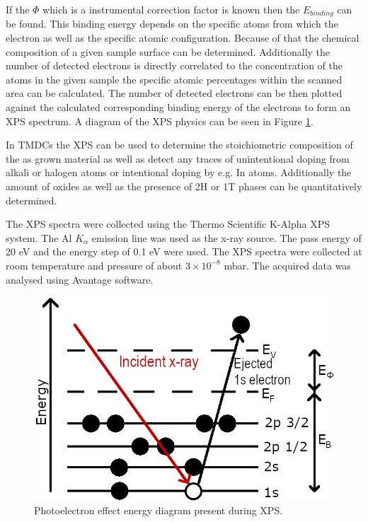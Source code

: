 If the $\Phi$ which is a instrumental correction factor is known then the $E_{binding}$ can be found. This binding energy depends on the specific atoms from which the electron as well as the specific atomic configuration. Because of that the chemical composition of a given sample surface can be determined. Additionally the number of detected electrons is directly correlated to the concentration of the atoms in the given sample the specific atomic percentages within the scanned area can be calculated. The number of detected electrons can be then plotted against the calculated corresponding binding energy of the electrons to form an XPS spectrum. A diagram of the XPS physics can be seen in Figure \ref{fig:MethodologyXPSSetup}.

In TMDCs the XPS can be used to determine the stoichiometric composition of the as grown material as well as detect any traces of unintentional doping from alkali or halogen atoms or intentional doping by e.g. In atoms. Additionally the amount of oxides as well as the presence of 2H or 1T phases can be quantitatively determined. 

The XPS spectra were collected using the Thermo Scientific K-Alpha XPS system. The Al $K_{\alpha}$ emission line was used as the x-ray source. The pass energy of 20 eV and the energy step of 0.1 eV were used. The XPS spectra were collected at room temperature and pressure of about $3 \times 10^{-8}$ mbar. The acquired data was analysed using Avantage software.

\begin{figure}[H]
	\begin{center}
		\includegraphics[scale=0.4]{Methodology/XPSSetup.png}
		\caption{Photoelectron effect energy diagram present during XPS.}
		\label{fig:MethodologyXPSSetup}
	\end{center}
\end{figure}

